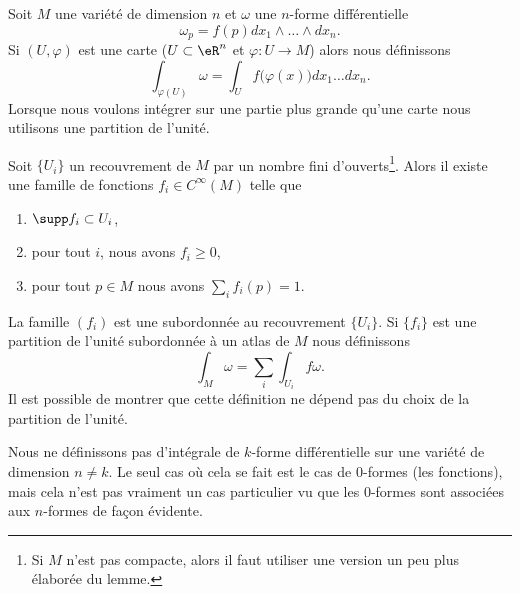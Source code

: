Soit \( M\) une variété de dimension \( n\) et \( \omega\) une \( n\)-forme différentielle
\begin{equation}
    \omega_p=f(p)dx_1\wedge\ldots\wedge dx_n.
\end{equation}
 Si \( (U,\varphi)\) est une carte (\( U\subset\eR^n\) et \( \varphi\colon U\to M\)) alors nous définissons
\begin{equation}
    \int_{\varphi(U)}\omega=\int_{U}f\big( \varphi(x) \big)dx_1\ldots dx_n.     
\end{equation}
Lorsque nous voulons intégrer sur une partie plus grande qu'une carte nous utilisons une partition de l'unité.
\begin{lemma}   \label{LemGPmRGZ}
    Soit \( \{ U_i \}\) un recouvrement de \( M\) par un nombre fini d'ouverts\footnote{Si \( M\) n'est pas compacte, alors il faut utiliser une version un peu plus élaborée du lemme\cite{SpindelGeomDoff}.}. Alors il existe une famille de fonctions \( f_i\in  C^{\infty}(M)\) telle que
    \begin{enumerate}
        \item
            \( \supp f_i\subset U_i\),
        \item
            pour tout \( i\), nous avons \( f_i\geq 0\),
        \item
            pour tout \( p\in M\) nous avons \( \sum_i f_i(p)=1\).
    \end{enumerate}
\end{lemma}
La famille \( (f_i)\) est une  subordonnée au recouvrement \( \{ U_i \}\). Si \( \{ f_i \}\) est une partition de l'unité subordonnée à un atlas de \( M\) nous définissons
\begin{equation}
    \int_M\omega=\sum_i\int_{U_i}f\omega.
\end{equation}
Il est possible de montrer que cette définition ne dépend pas du choix de la partition de l'unité.

\begin{remark}
    Nous ne définissons pas d'intégrale de \( k\)-forme différentielle sur une variété de dimension \( n\neq k\). Le seul cas où cela se fait est le cas de \( 0\)-formes (les fonctions), mais cela n'est pas vraiment un cas particulier vu que les \( 0\)-formes sont associées aux \( n\)-formes de façon évidente.
\end{remark}


